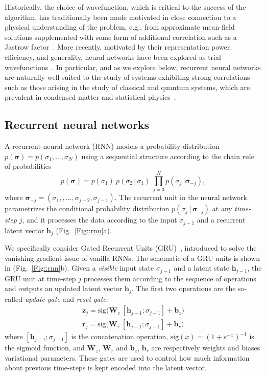 \documentclass[twocolumn,english,reprint,superscriptaddress,longbibliography,pra]{revtex4-1}
\begin{document}
Historically, the choice of wavefunction, which is critical to the success of the algorithm, has traditionally been made motivated in close connection to a physical understanding of the problem, e.g., from approximate mean-field solutions supplemented with some form of additional correlation such as a Jastrow factor~\cite{becca_sorella_2017}. More recently, motivated by their representation power, efficiency, and generality, neural networks have been explored as trial wavefunctions~\cite{Carleo_2017}.  In particular, and as we explore below, recurrent neural networks are naturally well-suited to the study of systems exhibiting strong correlations such as those arising in the study of classical and quantum systems, which are prevalent in condensed matter and statistical physics~\cite{Wu_2019,carrasquilla_povm,RNNWF_2020, roth2020iterative}.

\subsection{Recurrent neural networks}
A recurrent neural network (RNN) models a probability distribution $p(\bm{\sigma})=p(\sigma_1,\dots,\sigma_N)$ using a sequential structure according to the chain rule of probabilities
\begin{equation}
p(\bm{\sigma})=p(\sigma_1)\:p(\sigma_2\,|\,\sigma_1)\:\prod_{j=3}^Np(\sigma_j\,|\bm{\sigma}_{-j}),
\end{equation}
where $\bm{\sigma}_{-j}=(\sigma_1,,\dots,\sigma_{j-2},\sigma_{j-1})$. The recurrent unit in the neural network parametrizes the conditional probability distribution $p(\sigma_j\,|\,\bm{\sigma}_{-j})$ at any {\it time-step} $j$, and it processes the data according to the input $\sigma_{j-1}$ and a recurrent latent vector $\bm{h}_j$ (Fig.~\ref{Fig::rnn}a). 

We specifically consider Gated Recurrent Units (GRU)~\cite{cho-etal-2014-learning}, introduced to solve the vanishing gradient issue of vanilla RNNs. The schematic of a GRU units is shown in (Fig.~\ref{Fig::rnn}b). Given a {\it visible} input state $\sigma_{j-1}$ and a latent state $\bm{h}_{j-1}$, the GRU unit at time-step $j$ processes them according to the sequence of operations and outputs an updated latent vector $\bm{h}_j$. The first two operations are the so-called {\it update gate} and {\it reset gate}:
\begin{align}
\bm{z}_j = \text{sig}\Big(\bm{W}_z\:[\bm{h}_{j-1}; \sigma_{j-1}]+\bm{b}_z\Big)\\
\bm{r}_j = \text{sig}\Big(\bm{W}_r\:[\bm{h}_{j-1}; \sigma_{j-1}]+\bm{b}_r\Big)
\end{align}
where $[\bm{h}_{j-1}; \sigma_{j-1}]$ is the concatenation operation, $\text{sig}(x)=(1+e^{-x})^{-1}$ is the sigmoid function, and $\bm{W}_z$, $\bm{W}_r$ and $\bm{b}_z$, $\bm{b}_r$ are respectively weights and biases variational parameters. These gates are used to control how much information about previous time-steps is kept encoded into the latent vector. 
\end{document}
